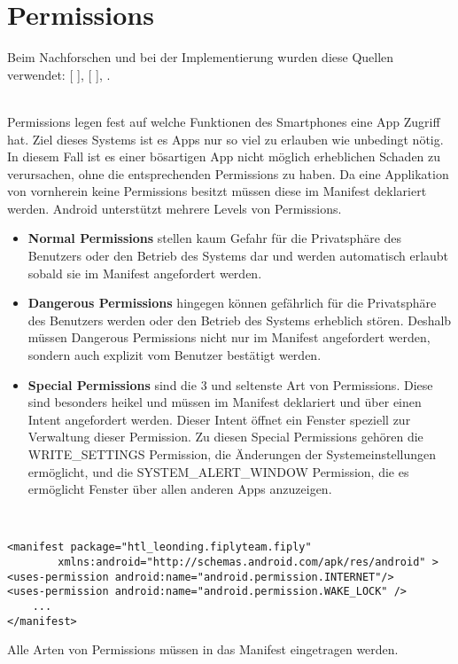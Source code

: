 \documentclass[FIPLY_base.tex]{subfiles}
\author{Andreas Denkmayr}
\date{25. Februar 2016}
\begin{document}
\section{Permissions}
Beim Nachforschen und bei der Implementierung wurden diese Quellen verwendet: 
[ \cite{bPermissions}],
[ \cite{adTPermissions}], .

\ \\
Permissions legen fest auf welche Funktionen des Smartphones eine App Zugriff hat.
Ziel dieses Systems ist es Apps nur so viel zu erlauben wie unbedingt nötig.
In diesem Fall ist es einer bösartigen App nicht möglich erheblichen Schaden zu verursachen, ohne die entsprechenden Permissions zu haben.
Da eine Applikation von vornherein keine Permissions besitzt müssen diese im Manifest deklariert werden.
Android unterstützt mehrere Levels von Permissions.
\begin{itemize}
\item \textbf{Normal Permissions} stellen kaum Gefahr für die Privatsphäre des Benutzers oder den Betrieb des Systems dar und werden automatisch erlaubt sobald sie im Manifest angefordert werden.

\item \textbf{Dangerous Permissions} hingegen können gefährlich für die Privatsphäre des Benutzers werden oder den Betrieb des Systems erheblich stören. 
Deshalb müssen Dangerous Permissions nicht nur im Manifest angefordert werden, sondern auch explizit vom Benutzer bestätigt werden.

\item \textbf{Special Permissions} sind die 3 und seltenste Art von Permissions. 
Diese sind besonders heikel und müssen im Manifest deklariert und über einen Intent angefordert werden.
Dieser Intent öffnet ein Fenster speziell zur Verwaltung dieser Permission. \newline
Zu diesen Special Permissions gehören die WRITE\_SETTINGS Permission, die Änderungen der Systemeinstellungen ermöglicht, 
und die SYSTEM\_ALERT\_WINDOW Permission, die es ermöglicht Fenster über allen anderen Apps anzuzeigen.
\end{itemize}
\ \\
\begin{lstlisting}
<manifest package="htl_leonding.fiplyteam.fiply"
		xmlns:android="http://schemas.android.com/apk/res/android" >
<uses-permission android:name="android.permission.INTERNET"/>
<uses-permission android:name="android.permission.WAKE_LOCK" />
	...
</manifest>
\end{lstlisting}
Alle Arten von Permissions müssen in das Manifest eingetragen werden.
\end{document}
